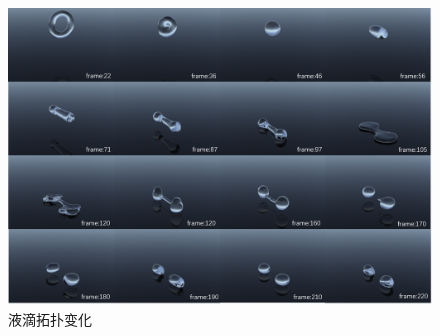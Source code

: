 \begin{figure}[htbp]
    \centering
    \includegraphics[scale=0.56]{./images/TorusSplit.png}
    \caption[液滴拓扑变化实验]{液滴拓扑变化}
    \label{fig: torus split experience}
\end{figure}

